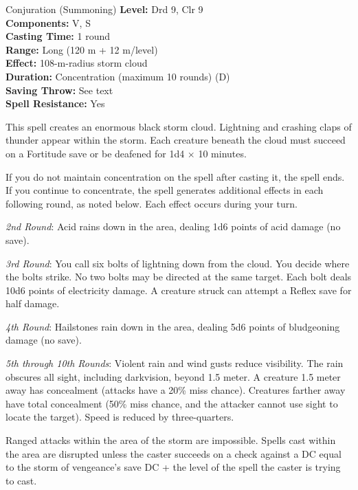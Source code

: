 {Conjuration (Summoning)}
{
	\textbf{Level:}
	Drd 9, Clr 9\\
	\textbf{Components:}
	V, S\\
	\textbf{Casting Time:}
	1 round\\
	\textbf{Range:}
	Long (120 m + 12 m/level)\\
	\textbf{Effect:}
	108-m-radius storm cloud\\
	\textbf{Duration:}
	Concentration (maximum 10 rounds) (D)\\
	\textbf{Saving Throw:}
	See text\\
	\textbf{Spell Resistance:}
	Yes\\
}
{
	This spell creates an enormous black storm cloud. Lightning and crashing claps of thunder appear within the storm. Each creature beneath the cloud must succeed on a Fortitude save or be deafened for 1d4 $\times$ 10 minutes.

	If you do not maintain concentration on the spell after casting it, the spell ends.  If you continue to concentrate, the spell generates additional effects in each following round, as noted below. Each effect occurs during your turn.

	\textit{2nd Round}:
	Acid rains down in the area, dealing 1d6 points of acid damage (no save).

	\textit{3rd Round}:
	You call six bolts of lightning down from the cloud. You decide where the bolts strike. No two bolts may be directed at the same target. Each bolt deals 10d6 points of electricity damage. A creature struck can attempt a Reflex save for half damage.

	\textit{4th Round}:
	Hailstones rain down in the area, dealing 5d6 points of bludgeoning damage (no save).

	\textit{5th through 10th Rounds}:
	Violent rain and wind gusts reduce visibility. The rain obscures all sight, including darkvision, beyond 1.5 meter. A creature 1.5 meter away has concealment (attacks have a 20\% miss chance). Creatures farther away have total concealment (50\% miss chance, and the attacker cannot use sight to locate the target). Speed is reduced by three-quarters.

	Ranged attacks within the area of the storm are impossible. Spells cast within the area are disrupted unless the caster succeeds on a  check against a DC equal to the storm of vengeance's save DC + the level of the spell the caster is trying to cast.

}
